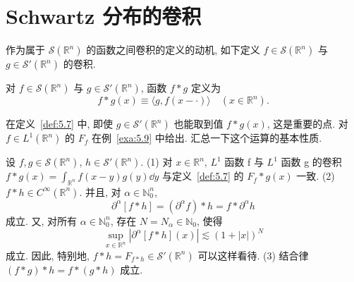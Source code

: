 
\section{Schwartz 分布的卷积}\label{sec:5.6}




作为属于 $\mathcal{S}(\mathbb{R}^{n})$ 的函数之间卷积的定义的动机, 如下定义 $f \in \mathcal{S}(\mathbb{R}^{n})$ 与 $g \in \mathcal{S}'(\mathbb{R}^{n})$ 的卷积.

\begin{definition}\label{def:5.7}
对 $f \in \mathcal{S}(\mathbb{R}^{n})$ 与 $g \in \mathcal{S}'(\mathbb{R}^{n})$, 函数 $f * g$ 定义为
\[
f * g(x) \equiv \langle g, f(x - \cdot)\rangle \quad (x \in \mathbb{R}^{n}).
\]
\end{definition}

在定义~\ref{def:5.7} 中, 即使 $g \in \mathcal{S}'(\mathbb{R}^{n})$ 也能取到值 $f * g(x)$, 这是重要的点. 对 $f \in L^{1}(\mathbb{R}^{n})$ 的 $F_{f}$ 在例~\ref{exa:5.9} 中给出. 汇总一下这个运算的基本性质.

\begin{theorem}[卷积的基本性质]\label{thm:5.12}
设 $f, g \in \mathcal{S}(\mathbb{R}^{n})$, $h \in \mathcal{S}'(\mathbb{R}^{n})$.
(1) 对 $x \in \mathbb{R}^{n}$, $L^{1}$ 函数 f 与 $L^{1}$ 函数 g 的卷积 $f * g(x) = \int_{\mathbb{R}^{n}}f(x-y)g(y)\dd y$ 与定义~\ref{def:5.7} 的 $F_{f} * g(x)$ 一致.
(2) $f * h \in C^{\infty}(\mathbb{R}^{n})$. 并且, 对 $\alpha \in \mathbb{N}_{0}^{n}$,
\begin{equation}\tag{5.18}
\partial^{\alpha}[f*h] = (\partial^{\alpha}f)*h = f*\partial^{\alpha}h
\label{eq:5.18}
\end{equation}
成立. 又, 对所有 $\alpha \in \mathbb{N}_{0}^{n}$, 存在 $N = N_{\alpha} \in \mathbb{N}_{0}$, 使得
\begin{equation}\tag{5.19}
\sup_{x \in \mathbb{R}^{n}}|\partial^{\alpha}[f*h](x)| \lesssim (1+|x|)^{N}
\label{eq:5.19}
\end{equation}
成立. 因此, 特别地, $f*h = F_{f*h} \in \mathcal{S}'(\mathbb{R}^{n})$ 可以这样看待.
(3) 结合律 $(f*g)*h = f*(g*h)$ 成立.
\end{theorem}

